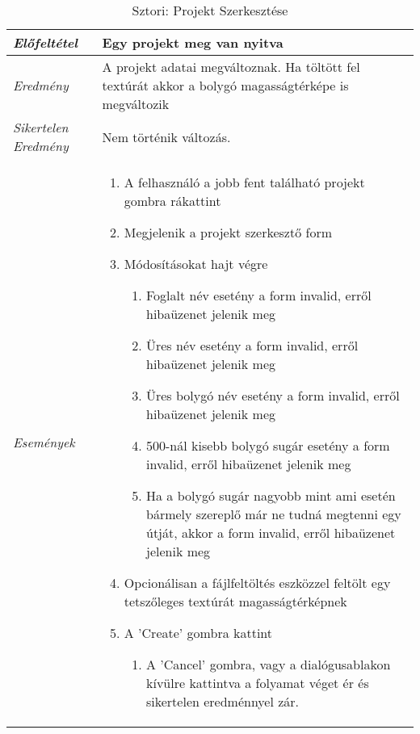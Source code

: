 \begin{table}[H]
	\centering
	\begin{tabular}{ | m{} | m{} | }
		\hline
		\emph{Előfeltétel} & Egy projekt meg van nyitva  \\
		\hline
		\emph{Eredmény} & A projekt adatai megváltoznak. Ha töltött fel textúrát akkor a bolygó magasságtérképe is megváltozik    \\
		\hline
		\emph{Sikertelen Eredmény} & Nem történik változás.  \\
		\hline
		\hline
		\emph{Események} &

		\begin{enumerate}
			\item A felhasználó a jobb fent található projekt gombra rákattint
			\item Megjelenik a projekt szerkesztő form
			\item Módosításokat hajt végre
			\begin{enumerate}
				\item Foglalt név esetény a form invalid, erről hibaüzenet jelenik meg
				\item Üres név esetény a form invalid, erről hibaüzenet jelenik meg
				\item Üres bolygó név esetény a form invalid, erről hibaüzenet jelenik meg
				\item 500-nál kisebb bolygó sugár esetény a form invalid, erről hibaüzenet jelenik meg
				\item Ha a bolygó sugár nagyobb mint ami esetén bármely szereplő már ne tudná megtenni egy útját, akkor a form invalid, erről hibaüzenet jelenik meg
			\end{enumerate}
			\item Opcionálisan a fájlfeltöltés eszközzel feltölt egy tetszőleges textúrát magasságtérképnek
			\item A 'Create' gombra kattint
			\begin{enumerate}
				\item A 'Cancel' gombra, vagy a dialógusablakon kívülre kattintva a folyamat véget ér és sikertelen eredménnyel zár.
			\end{enumerate}
		\end{enumerate}

		\\
		\hline
	\end{tabular}
	\caption{Sztori: Projekt Szerkesztése}
	\label{tab:story-project-edit}
\end{table}


